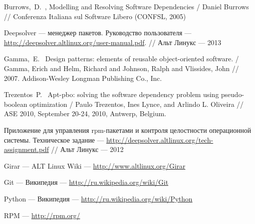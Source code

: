 Burrows,~D.~,
Modelling and Resolving Software Dependencies /
Daniel Burrows //
Conferenza Italiana sul Software Libero (CONFSL, 2005)

Deepsolver --- менеджер пакетов. Руководство пользователя
--- \url{http://deepsolver.altlinux.org/user-manual.pdf}. // Альт Линукс --- 2013

Gamma,~E.~
Design patterns: elements of reusable object-oriented software. /
Gamma, Erich and Helm, Richard and Johnson, Ralph and Vlissides, John //
2007. Addison-Wesley Longman Publishing Co., Inc.

Trezentos~P.~
Apt-pbo: solving the software dependency problem using pseudo-boolean optimization /
Paulo Trezentos, Ines Lynce, and Arlindo L. Oliveira //
ASE 2010, September 20-24, 2010, Antwerp, Belgium.

Приложение для управления rpm-пакетами и контроля целостности операционной системы. Техническое задание 
--- \url{http://deepsolver.altlinux.org/tech-assignment.pdf} // Альт Линукс --- 2012

Girar --- ALT Linux Wiki --- \url{http://www.altlinux.org/Girar}

Git --- Википедия --- \url{http://ru.wikipedia.org/wiki/Git}

Python --- Википедия
--- \url{http://ru.wikipedia.org/wiki/Python}

RPM --- \url{http://rpm.org/}


